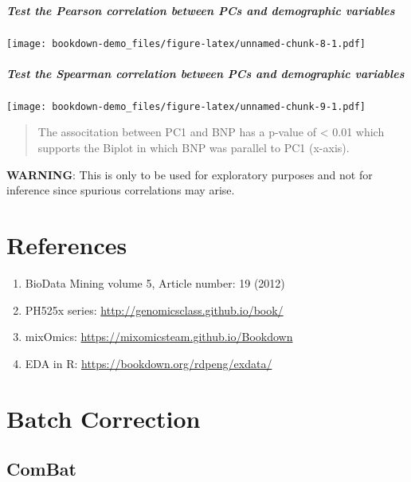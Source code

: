 \documentclass[]{book}
\providecommand{\tightlist}{%
  \setlength{\itemsep}{0pt}\setlength{\parskip}{0pt}}
\let\oldparagraph\paragraph
\renewcommand{\paragraph}[1]{\oldparagraph{#1}\mbox{}}
\begin{document}
\paragraph{Test the Pearson correlation between PCs and demographic
variables}\label{test-the-pearson-correlation-between-pcs-and-demographic-variables}

\texttt{[image: bookdown-demo\_files/figure-latex/unnamed-chunk-8-1.pdf]}

\paragraph{Test the Spearman correlation between PCs and demographic
variables}\label{test-the-spearman-correlation-between-pcs-and-demographic-variables}

\texttt{[image: bookdown-demo\_files/figure-latex/unnamed-chunk-9-1.pdf]}

\begin{quote}
The associtation between PC1 and BNP has a p-value of \textless{} 0.01
which supports the Biplot in which BNP was parallel to PC1 (x-axis).
\end{quote}

\textbf{WARNING}: This is only to be used for exploratory purposes and
not for inference since spurious correlations may arise.

\chapter{References}\label{references}

\begin{enumerate}
\def\labelenumi{\arabic{enumi}.}
\tightlist
\item
  BioData Mining volume 5, Article number: 19 (2012)\\
\item
  PH525x series: \url{http://genomicsclass.github.io/book/}
\item
  mixOmics: \url{https://mixomicsteam.github.io/Bookdown}
\item
  EDA in R: \url{https://bookdown.org/rdpeng/exdata/}
\end{enumerate}

\chapter{Batch Correction}\label{batch-correction}

\section{ComBat}\label{combat}
\end{document}
